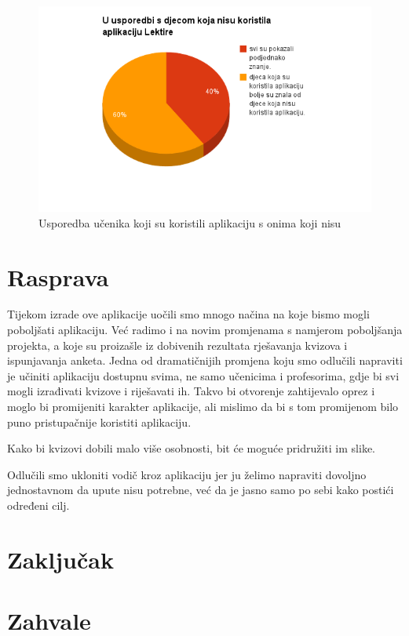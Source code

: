 \documentclass{scrreprt}
\begin{document}
\begin{figure}[H]
  \includegraphics[width=\textwidth, clip=true, trim=0 2.5cm 0 0]{comparison}
  \caption{Usporedba učenika koji su koristili aplikaciju s onima koji nisu}
\end{figure}

\chapter{Rasprava}

Tijekom izrade ove aplikacije uočili smo mnogo načina na koje bismo mogli
poboljšati aplikaciju. Već radimo i na novim promjenama s namjerom poboljšanja
projekta, a koje su proizašle iz dobivenih rezultata rješavanja kvizova i
ispunjavanja anketa. Jedna od dramatičnijih promjena koju smo odlučili napraviti
je učiniti aplikaciju dostupnu svima, ne samo učenicima i profesorima, gdje bi
svi mogli izrađivati kvizove i riješavati ih. Takvo bi otvorenje zahtijevalo
oprez i moglo bi promijeniti karakter aplikacije, ali mislimo da bi s tom
promijenom bilo puno pristupačnije koristiti aplikaciju.

Kako bi kvizovi dobili malo više osobnosti, bit će moguće pridružiti im slike.

Odlučili smo ukloniti vodič kroz aplikaciju jer ju želimo napraviti dovoljno
jednostavnom da upute nisu potrebne, već da je jasno samo po sebi kako postići
određeni cilj.

\chapter{Zaključak}

\chapter{Zahvale}
\end{document}

